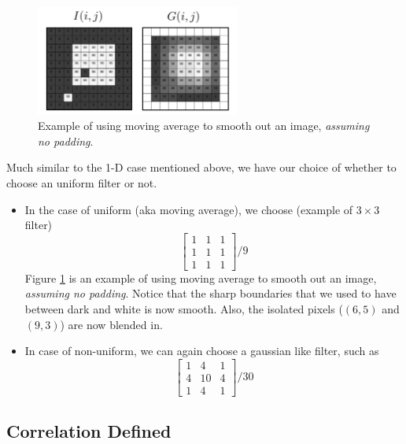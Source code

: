 \documentclass[11pt]{article}
\begin{document}
\begin{figure}[H]
	\center\includegraphics[width=0.6\textwidth]{figs/2dmovingaverage}
	\caption{Example of using moving average to smooth out an image, \textit{assuming no padding}. }
	\label{fig:2dmovingaverage}
\end{figure} 

Much similar to the 1-D case mentioned above, we have our choice of whether to choose an uniform filter or not. 
\begin{itemize}
	\item In the case of uniform (aka moving average), we choose (example of $3 \times 3$ filter)
		\begin{equation}
			\begin{bmatrix}
				1 & 1 & 1 \\
				1 & 1 & 1 \\
				1 & 1 & 1
			\end{bmatrix} / 9
		\end{equation}
	Figure \ref{fig:2dmovingaverage} is an example of using moving average to smooth out an image, \textit{assuming no padding}. Notice that the sharp boundaries that we used to have between dark and white is now smooth. Also, the isolated pixels ($(6, 5)$ and $(9, 3)$) are now blended in.  
	\item In case of non-uniform, we can again choose a gaussian like filter, such as
		\begin{equation}
			\begin{bmatrix}
				1 & 4 & 1 \\
				4 & 10 & 4 \\
				1 & 4 & 1
			\end{bmatrix} / 30
		\end{equation}
\end{itemize}

\subsection{Correlation Defined}
\end{document}
